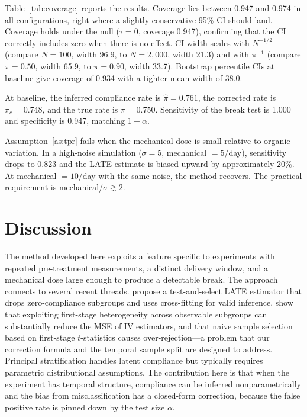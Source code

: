 \documentclass[12pt]{article}
\begin{document}
Table~\ref{tab:coverage} reports the results. Coverage lies between 0.947 and 0.974 in all configurations, right where a slightly conservative 95\% CI should land. Coverage holds under the null ($\tau = 0$, coverage 0.947), confirming that the CI correctly includes zero when there is no effect. CI width scales with $N^{-1/2}$ (compare $N = 100$, width 96.9, to $N = 2{,}000$, width 21.3) and with $\pi^{-1}$ (compare $\pi = 0.50$, width 65.9, to $\pi = 0.90$, width 33.7). Bootstrap percentile CIs at baseline give coverage of 0.934 with a tighter mean width of 38.0.

At baseline, the inferred compliance rate is $\hat{\pi} = 0.761$, the corrected rate is $\pi_c = 0.748$, and the true rate is $\pi = 0.750$. Sensitivity of the break test is 1.000 and specificity is 0.947, matching $1 - \alpha$.

Assumption~\ref{as:tpr} fails when the mechanical dose is small relative to organic variation. In a high-noise simulation ($\sigma = 5$, mechanical $= 5$/day), sensitivity drops to 0.823 and the LATE estimate is biased upward by approximately 20\%. At mechanical $= 10$/day with the same noise, the method recovers. The practical requirement is mechanical/$\sigma \gtrsim 2$.

\section{Discussion}

The method developed here exploits a feature specific to experiments with repeated pre-treatment measurements, a distinct delivery window, and a mechanical dose large enough to produce a detectable break. The approach connects to several recent threads. \citet{hazard2023} propose a test-and-select LATE estimator that drops zero-compliance subgroups and uses cross-fitting for valid inference. \citet{abadie2024} show that exploiting first-stage heterogeneity across observable subgroups can substantially reduce the MSE of IV estimators, and that naive sample selection based on first-stage $t$-statistics causes over-rejection---a problem that our correction formula and the temporal sample split are designed to address. Principal stratification \citep{frangakis2002} handles latent compliance but typically requires parametric distributional assumptions. The contribution here is that when the experiment has temporal structure, compliance can be inferred nonparametrically and the bias from misclassification has a closed-form correction, because the false positive rate is pinned down by the test size $\alpha$.



\end{document}

